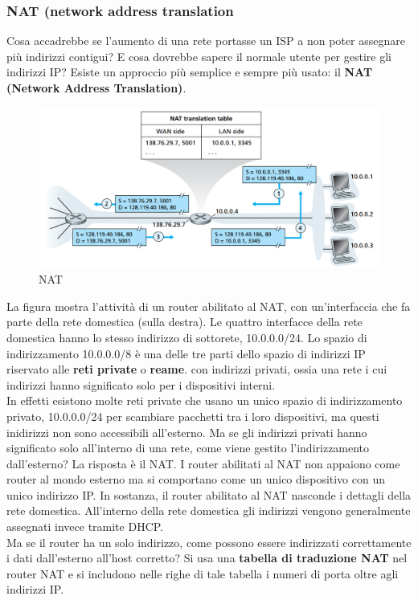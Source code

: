 \documentclass[11pt,a4paper]{article}
\begin{document}
\subsubsection{NAT (network address translation}
Cosa accadrebbe se l'aumento di una rete portasse un ISP a non poter assegnare più indirizzi contigui? E cosa dovrebbe sapere il normale utente per gestire gli indirizzi IP? Esiste un approccio più semplice e sempre più usato: il \textbf{NAT (Network Address Translation)}.
\begin{figure}
	\includegraphics[scale=0.6]{img/058.png}
	\caption{NAT}
\end{figure}
La figura mostra l'attività di un router abilitato al NAT, con un'interfaccia che fa parte della rete domestica (sulla destra). Le quattro interfacce della rete domestica hanno lo stesso indirizzo di sottorete, 10.0.0.0/24. Lo spazio di indirizzamento 10.0.0.0/8 è una delle tre parti dello spazio di indirizzi IP riservato alle \textbf{reti private} o \textbf{reame}. con indirizzi privati, ossia una rete i cui indirizzi hanno significato solo per i dispositivi interni. \\
In effetti esistono molte reti private che usano un unico spazio di indirizzamento privato, 10.0.0.0/24 per scambiare pacchetti tra i loro dispositivi, ma questi inidirizzi non sono accessibili all'esterno. Ma se gli indirizzi privati hanno significato solo all'interno di una rete, come viene gestito l'indirizzamento dall'esterno? La risposta è il NAT. I router abilitati al NAT non appaiono come router al mondo esterno ma si comportano come un unico dispositivo con un unico indirizzo IP. In sostanza, il router abilitato al NAT nasconde i dettagli della rete domestica. All'interno della rete domestica gli indirizzi vengono generalmente assegnati invece tramite DHCP. \\
Ma se il router ha un solo indirizzo, come possono essere indirizzati correttamente i dati dall'esterno all'host corretto? Si usa una \textbf{tabella di traduzione NAT} nel router NAT e si includono nelle righe di tale tabella i numeri di porta oltre agli indirizzi IP. \\
\end{document}
